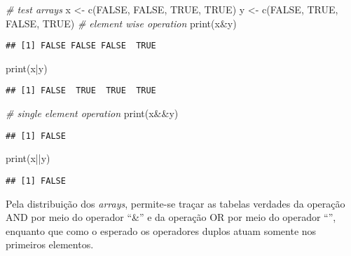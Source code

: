 \documentclass[
]{article}
\newenvironment{Shaded}{\begin{snugshade}}{\end{snugshade}}
\newcommand{\CommentTok}[1]{\textcolor[rgb]{0.56,0.35,0.01}{\textit{#1}}}
\newcommand{\ConstantTok}[1]{\textcolor[rgb]{0.00,0.00,0.00}{#1}}
\newcommand{\FunctionTok}[1]{\textcolor[rgb]{0.00,0.00,0.00}{#1}}
\newcommand{\NormalTok}[1]{#1}
\newcommand{\OtherTok}[1]{\textcolor[rgb]{0.56,0.35,0.01}{#1}}
\newcommand{\SpecialCharTok}[1]{\textcolor[rgb]{0.00,0.00,0.00}{#1}}
\begin{document}
\begin{Shaded}
\begin{Highlighting}[]
\CommentTok{\# test arrays}
\NormalTok{x }\OtherTok{\textless{}{-}} \FunctionTok{c}\NormalTok{(}\ConstantTok{FALSE}\NormalTok{, }\ConstantTok{FALSE}\NormalTok{, }\ConstantTok{TRUE}\NormalTok{, }\ConstantTok{TRUE}\NormalTok{)}
\NormalTok{y }\OtherTok{\textless{}{-}} \FunctionTok{c}\NormalTok{(}\ConstantTok{FALSE}\NormalTok{, }\ConstantTok{TRUE}\NormalTok{, }\ConstantTok{FALSE}\NormalTok{, }\ConstantTok{TRUE}\NormalTok{)}
\CommentTok{\# element wise operation}
\FunctionTok{print}\NormalTok{(x}\SpecialCharTok{\&}\NormalTok{y)}
\end{Highlighting}
\end{Shaded}

\begin{verbatim}
## [1] FALSE FALSE FALSE  TRUE
\end{verbatim}

\begin{Shaded}
\begin{Highlighting}[]
\FunctionTok{print}\NormalTok{(x}\SpecialCharTok{|}\NormalTok{y)}
\end{Highlighting}
\end{Shaded}

\begin{verbatim}
## [1] FALSE  TRUE  TRUE  TRUE
\end{verbatim}

\begin{Shaded}
\begin{Highlighting}[]
\CommentTok{\# single element operation}
\FunctionTok{print}\NormalTok{(x}\SpecialCharTok{\&\&}\NormalTok{y)}
\end{Highlighting}
\end{Shaded}

\begin{verbatim}
## [1] FALSE
\end{verbatim}

\begin{Shaded}
\begin{Highlighting}[]
\FunctionTok{print}\NormalTok{(x}\SpecialCharTok{||}\NormalTok{y)}
\end{Highlighting}
\end{Shaded}

\begin{verbatim}
## [1] FALSE
\end{verbatim}

Pela distribuição dos \emph{arrays}, permite-se traçar as tabelas
verdades da operação AND por meio do operador ``\&'' e da operação OR
por meio do operador ``\textbar{}'', enquanto que como o esperado os
operadores duplos atuam somente nos primeiros elementos.
\end{document}
